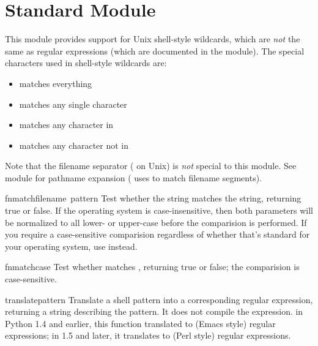 \section{Standard Module }
\label{module-fnmatch}

This module provides support for Unix shell-style wildcards, which are
\emph{not} the same as regular expressions (which are
documented in the  module).  The special characters used
in shell-style wildcards are:
\begin{itemize}
\item[\code{*}] matches everything
\item[\code{?}]	matches any single character
\item[\code{[}\var{seq}\code{]}] matches any character in 
\item[\code{[!}\var{seq}\code{]}] matches any character not in 
\end{itemize}

Note that the filename separator ( on Unix) is \emph{not}
special to this module.  See module  for pathname expansion
( uses  to match filename segments).

\renewcommand{\indexsubitem}{(in module fnmatch)}

\begin{funcdesc}{fnmatch}{filename\, pattern}
Test whether the  string matches the 
string, returning true or false.  If the operating system is
case-insensitive, then both parameters will be normalized to all
lower- or upper-case before the comparision is performed.  If you
require a case-sensitive comparision regardless of whether that's
standard for your operating system, use  instead.
\end{funcdesc}

\begin{funcdesc}{fnmatchcase}{}
Test whether  matches , returning true or
false; the comparision is case-sensitive.
\end{funcdesc}

\begin{funcdesc}{translate}{pattern}
Translate a shell pattern into a corresponding regular expression,
returning a string describing the pattern.  It does not compile the
expression.   in Python 1.4 and earlier, this
function translated to  (Emacs style) regular expressions;
in 1.5 and later, it translates to  (Perl style) regular
expressions.
\end{funcdesc}

